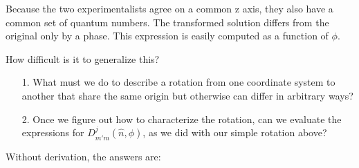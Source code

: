 Because the two experimentalists agree on a common z axis, they also have
a common set of quantum numbers. The transformed solution differs from the
original only by a phase. This expression
is easily computed as a function of $\phi$.

How difficult is it to generalize this? 

\begin{itemize}
  \item[1.] What must we do to describe a rotation from one coordinate system
    to another that share the same origin but otherwise can differ in arbitrary
    ways?
  \item[2.] Once we figure out how to characterize the rotation, can we
    evaluate the expressions for $D_{m'm}^j (\hat{n}, \phi)$, as we did with
    our simple rotation above? 
\end{itemize}

Without derivation, the answers are: 

